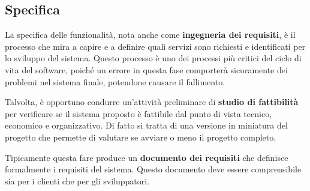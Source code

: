 \subsection{Specifica}
La specifica delle funzionalità, nota anche come \textbf{ingegneria dei requisiti},
è il processo che mira a capire e a definire quali servizi sono richiesti e identificati 
per lo sviluppo del sistema. 
Questo processo è uno dei processi più critici del ciclo di vita del software, poiché
un errore in questa fase comporterà sicuramente dei problemi nel sistema finale, potendone 
causare il fallimento. 

Talvolta, è opportuno condurre un'attività preliminare di \textbf{studio di fattibilità}
per verificare se il sistema proposto è fattibile dal punto di vista tecnico, economico
e organizzativo. Di fatto si tratta di una versione in miniatura del progetto che 
permette di valutare se avviare o meno il progetto completo.

Tipicamente questa fare produce un \textbf{documento dei requisiti} che definisce
formalmente i requisiti del sistema. Questo documento deve essere comprensibile sia
per i clienti che per gli sviluppatori.
